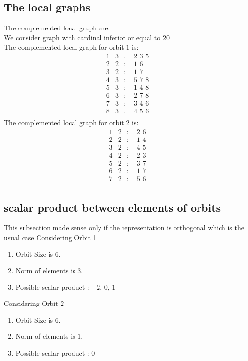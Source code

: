 \documentclass[12pt]{article}
\begin{document}
\subsection{The local graphs}
The complemented local graph are:\\
We consider graph with cardinal inferior or equal to $20$\\
The complemented local graph for orbit $1$ is:
\begin{equation*}
\begin{array}{rrcl}
1&3&:&\,\,2\,\,3\,\,5\\
2&2&:&\,\,1\,\,6\\
3&2&:&\,\,1\,\,7\\
4&3&:&\,\,5\,\,7\,\,8\\
5&3&:&\,\,1\,\,4\,\,8\\
6&3&:&\,\,2\,\,7\,\,8\\
7&3&:&\,\,3\,\,4\,\,6\\
8&3&:&\,\,4\,\,5\,\,6\\
\end{array}
\end{equation*}
The complemented local graph for orbit $2$ is:
\begin{equation*}
\begin{array}{rrcl}
1&2&:&\,\,2\,\,6\\
2&2&:&\,\,1\,\,4\\
3&2&:&\,\,4\,\,5\\
4&2&:&\,\,2\,\,3\\
5&2&:&\,\,3\,\,7\\
6&2&:&\,\,1\,\,7\\
7&2&:&\,\,5\,\,6\\
\end{array}
\end{equation*}
\subsection{scalar product between elements of orbits}
\noindent This subsection made sense only if the representation is orthogonal which is the usual case
Considering Orbit 1
\begin{enumerate}
\item Orbit Size is $6$.
\item Norm of elements is $3$.
\item Possible scalar product : $-2$, $0$, $1$
\end{enumerate}
Considering Orbit 2
\begin{enumerate}
\item Orbit Size is $6$.
\item Norm of elements is $1$.
\item Possible scalar product : $0$
\end{enumerate}
\end{document}
